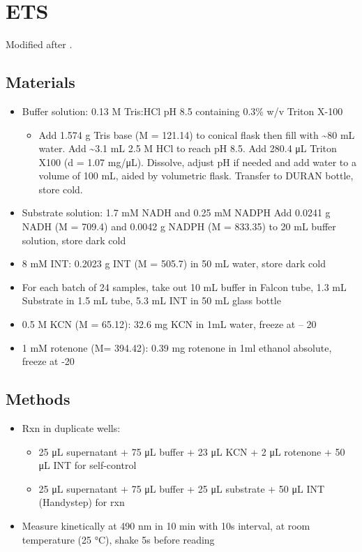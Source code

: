 \documentclass[
]{book}
\providecommand{\tightlist}{%
  \setlength{\itemsep}{0pt}\setlength{\parskip}{0pt}}
\begin{document}
\hypertarget{ETS}{%
\chapter{ETS}\label{ETS}}

Modified after \textcite{decoen1997}.

\hypertarget{materials-1}{%
\section{Materials}\label{materials-1}}

\begin{itemize}
\tightlist
\item
  Buffer solution: 0.13 M Tris:HCl pH 8.5 containing 0.3\% w/v Triton X-100

  \begin{itemize}
  \tightlist
  \item
    Add 1.574 g Tris base (M = 121.14) to conical flask then fill with \textasciitilde80 mL water. Add \textasciitilde3.1 mL 2.5 M HCl to reach pH 8.5. Add 280.4 μL Triton X100 (d = 1.07 mg/μL). Dissolve, adjust pH if needed and add water to a volume of 100 mL, aided by volumetric flask. Transfer to DURAN bottle, store cold.
  \end{itemize}
\item
  Substrate solution: 1.7 mM NADH and 0.25 mM NADPH
  Add 0.0241 g NADH (M = 709.4) and 0.0042 g NADPH (M = 833.35) to 20 mL buffer solution, store dark cold
\item
  8 mM INT: 0.2023 g INT (M = 505.7) in 50 mL water, store dark cold
\item
  For each batch of 24 samples, take out 10 mL buffer in Falcon tube, 1.3 mL Substrate in 1.5 mL tube, 5.3 mL INT in 50 mL glass bottle
\item
  0.5 M KCN (M = 65.12): 32.6 mg KCN in 1mL water, freeze at -- 20
\item
  1 mM rotenone (M= 394.42): 0.39 mg rotenone in 1ml ethanol absolute, freeze at -20
\end{itemize}

\hypertarget{methods-1}{%
\section{Methods}\label{methods-1}}

\begin{itemize}
\tightlist
\item
  Rxn in duplicate wells:

  \begin{itemize}
  \tightlist
  \item
    25 μL supernatant + 75 μL buffer + 23 μL KCN + 2 μL rotenone + 50 μL INT for self-control
  \item
    25 μL supernatant + 75 μL buffer + 25 μL substrate + 50 μL INT (Handystep) for rxn
  \end{itemize}
\item
  Measure kinetically at 490 nm in 10 min with 10s interval, at room temperature (25 °C), shake 5s before reading
\end{itemize}
\end{document}
